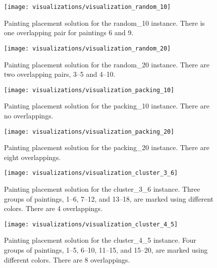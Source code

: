 \begin{figure}[h!]
    \texttt{[image: visualizations/visualization\_random\_10]}
    \caption[Painting placement solution for the random\_10 instance]
        {Painting placement solution for the random\_10 instance.
    There is one overlapping pair for paintings 6 and 9.}
    \label{fig:results:visualization-random-10}
\end{figure}

\begin{figure}[h!]
    \texttt{[image: visualizations/visualization\_random\_20]}
    \caption[Painting placement solution for the random\_20 instance]
        {Painting placement solution for the random\_20 instance.
    There are two overlapping pairs, 3–5 and 4–10.}
    \label{fig:results:visualization-random-20}
\end{figure}

\begin{figure}[h!]
    \texttt{[image: visualizations/visualization\_packing\_10]}
    \caption[Painting placement solution for the packing\_10 instance]
        {Painting placement solution for the packing\_10 instance.
    There are no overlappings.}
    \label{fig:results:visualization-packing-10}
\end{figure}

\begin{figure}[h!]
    \texttt{[image: visualizations/visualization\_packing\_20]}
    \caption[Painting placement solution for the packing\_20 instance]
        {Painting placement solution for the packing\_20 instance.
    There are eight overlappings.}
    \label{fig:results:visualization-packing-20}
\end{figure}

\begin{figure}[h!]
    \texttt{[image: visualizations/visualization\_cluster\_3\_6]}
    \caption[Painting placement solution for the cluster\_3\_6 instance]
        { Painting placement solution for the cluster\_3\_6 instance.
    Three groups of paintings, \numrange{1}{6}, \numrange{7}{12}, and \numrange{13}{18}, are marked using different colors.
    There are 4 overlappings.}
    \label{fig:results:visualization-cluster-3-6}
\end{figure}

\begin{figure}[h!]
    \texttt{[image: visualizations/visualization\_cluster\_4\_5]}
    \caption[Painting placement solution for the cluster\_4\_5 instance]
        { Painting placement solution for the cluster\_4\_5 instance.
    Four groups of paintings, \numrange{1}{5}, \numrange{6}{10}, \numrange{11}{15}, and \numrange{15}{20}, are marked using different colors.
    There are 8 overlappings.}
    \label{fig:results:visualization-cluster-4-5}
\end{figure}


